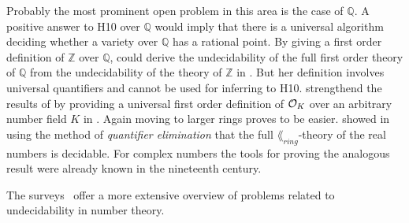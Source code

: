 Probably the most prominent open problem in this area is the case of \(ℚ\). A
positive answer to \textsc{H10} over \(ℚ\) would imply that there is a universal
algorithm deciding whether a variety over \(ℚ\) has a rational point. By giving
a first order definition of \(ℤ\) over \(ℚ\), \textcite{Robinson1949} could
derive the undecidability of the full first order theory of \(ℚ\) from the
undecidability of the theory of \(ℤ\) in \citeyear{Robinson1949}. But her
definition involves universal quantifiers and cannot be used for inferring to
\textsc{H10}. \Textcite{Park2013} strengthend the results of
\textcite{Robinson1949,Robinson1959} by providing a universal first order
definition of \(\mathcal{O}_{K}\) over an arbitrary number field \(K\) in
\citeyear{Park2013}. Again moving to larger rings proves to be easier.
\textcite{Tarski1931} showed in \citeyear{Tarski1931} using the method of
\emph{quantifier elimination} that the full \(\lang_{ring}\)-theory of the real
numbers is decidable. For complex numbers the tools for proving the analogous
result were already known in the nineteenth century.

The surveys~\cite{Koenigsmann2014,Poonen2008} offer a more extensive overview of
problems related to undecidability in number theory.
